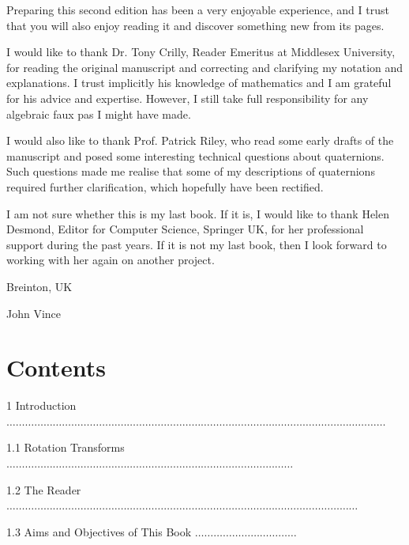 \documentclass[10pt]{article}
\begin{document}
Preparing this second edition has been a very enjoyable experience, and I trust that you will also enjoy reading it and discover something new from its pages.

I would like to thank Dr. Tony Crilly, Reader Emeritus at Middlesex University, for reading the original manuscript and correcting and clarifying my notation and explanations. I trust implicitly his knowledge of mathematics and I am grateful for his advice and expertise. However, I still take full responsibility for any algebraic faux pas I might have made.

I would also like to thank Prof. Patrick Riley, who read some early drafts of the manuscript and posed some interesting technical questions about quaternions. Such questions made me realise that some of my descriptions of quaternions required further clarification, which hopefully have been rectified.

I am not sure whether this is my last book. If it is, I would like to thank Helen Desmond, Editor for Computer Science, Springer UK, for her professional support during the past years. If it is not my last book, then I look forward to working with her again on another project.

Breinton, UK

John Vince

\section{Contents}
1 Introduction $\ldots \ldots \ldots \ldots \ldots \ldots \ldots \ldots \ldots \ldots \ldots \ldots \ldots \ldots \ldots \ldots \ldots \ldots \ldots \ldots \ldots \ldots \ldots \ldots \ldots \ldots \ldots \ldots \ldots \ldots \ldots \ldots \ldots \ldots \ldots \ldots \ldots \ldots \ldots \ldots \ldots$

1.1 Rotation Transforms $\ldots \ldots \ldots \ldots \ldots \ldots \ldots \ldots \ldots \ldots \ldots \ldots \ldots \ldots \ldots \ldots \ldots \ldots \ldots \ldots \ldots \ldots \ldots \ldots \ldots \ldots \ldots \ldots \ldots \ldots \ldots$

1.2 The Reader $\ldots \ldots \ldots \ldots \ldots \ldots \ldots \ldots \ldots \ldots \ldots \ldots \ldots \ldots \ldots \ldots \ldots \ldots \ldots \ldots \ldots \ldots \ldots \ldots \ldots \ldots \ldots \ldots \ldots \ldots \ldots \ldots \ldots \ldots \ldots \ldots \ldots \ldots$

1.3 Aims and Objectives of This Book $\ldots \ldots \ldots \ldots \ldots \ldots \ldots \ldots \ldots \ldots \ldots$
\end{document}
